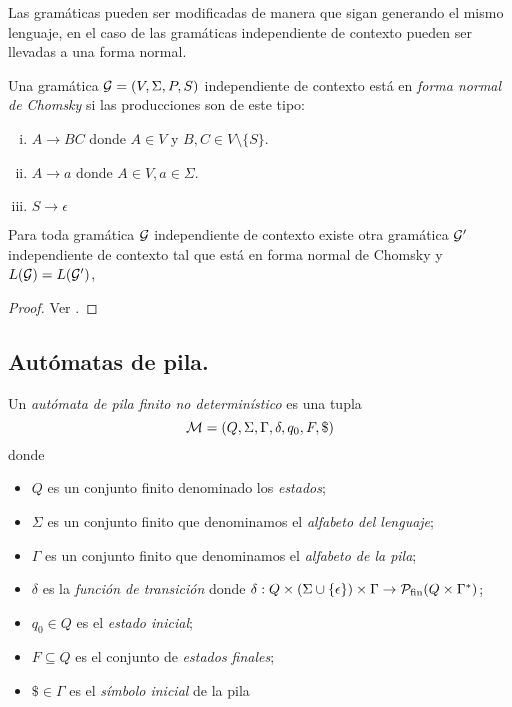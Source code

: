 \documentclass[tesis.tex]{subfiles}
\begin{document}
Las gramáticas pueden ser modificadas de manera que sigan generando el mismo lenguaje, en el caso de las gramáticas independiente de contexto pueden ser llevadas a una forma normal.

\begin{deff}
	Una gramática ${\cal G} = (V, \Sigma, P, S)$ independiente de contexto está en \emph{forma normal de Chomsky} si las producciones son de este tipo:
	\begin{enumerate}[i)]
		\item $A \to BC$ donde $A\in V$ y $B,C \in V \setminus \{ S \}$.
		\item $A \to a$ donde $A \in V, a \in \Sigma$.
		\item $S \to \epsilon$ 
	\end{enumerate}
\end{deff}

\begin{prop}\label{prop_fn_Chomsky}
	Para toda gramática $\cal G$ independiente de contexto existe otra gramática $\cal G'$ independiente de contexto tal que está en forma normal de Chomsky y $L({\cal G}) = L(\cal G')$,
\end{prop}

\begin{proof}
	Ver \cite[pp.274-275]{hopcraft-ullman}.
\end{proof}

\subsection{Autómatas de pila.}

\begin{deff}\label{deff_apnd}
	Un \emph{autómata de pila finito no determinístico} es una tupla 
	\[
	{\cal M } = (Q, \Sigma, \Gamma, \delta, q_0, F, \$)
	\]
	donde 
	\begin{itemize}
		\item $Q$ es un conjunto finito denominado los \emph{estados};
		\item $\Sigma$ es un conjunto finito que denominamos el \emph{alfabeto del lenguaje};
		\item $\Gamma$ es un conjunto finito que denominamos el \emph{alfabeto de la pila};
		\item $\delta$ es la \emph{función de transición} donde $\delta: Q  \times (\Sigma \cup \{ \epsilon \}) \times \Gamma \to {\cal P}_{\textrm{fin}}( Q  \times \Gamma^*)$;
		\item $q_0 \in Q$ es el \emph{estado inicial};
		\item $F \subseteq Q$ es el conjunto de \emph{estados finales};
		\item $\$ \in \Gamma$ es el \emph{símbolo inicial} de la pila
	\end{itemize}
\end{deff}
\end{document}
